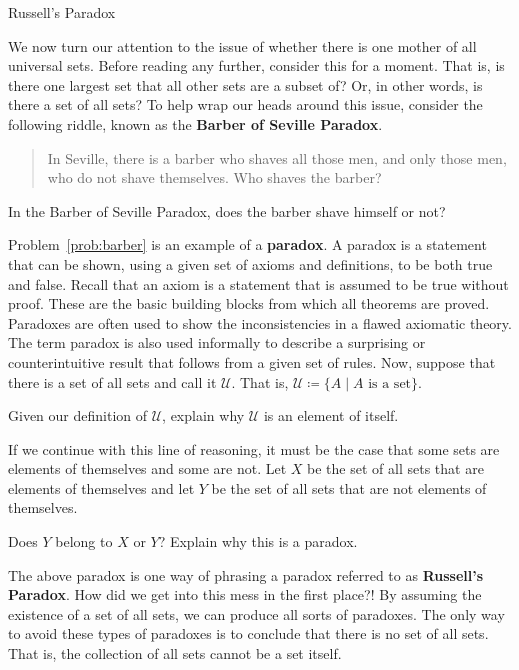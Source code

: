 \begin{section}{Russell's Paradox}\label{sec:RussellsParadox}

We now turn our attention to the issue of whether there is one mother of all universal sets.  Before reading any further, consider this for a moment.  That is, is there one largest set that all other sets are a subset of?  Or, in other words, is there a set of all sets?  To help wrap our heads around this issue, consider the following riddle, known as the \textbf{Barber of Seville Paradox}.

\begin{quote}
In Seville, there is a barber who shaves all those men, and only those men, who do not shave themselves.  Who shaves the barber?
\end{quote}

\begin{problem}\label{prob:barber}
In the Barber of Seville Paradox, does the barber shave himself or not?
\end{problem}

Problem~\ref{prob:barber} is an example of a \textbf{paradox}. A paradox is a statement that can be shown, using a given set of axioms and definitions, to be both true and false. Recall that an axiom is a statement that is assumed to be true without proof. These are the basic building blocks from which all theorems are proved. Paradoxes are often used to show the inconsistencies in a flawed axiomatic theory.  The term paradox is also used informally to describe a surprising or counterintuitive result that follows from a given set of rules.  Now, suppose that there is a set of all sets and call it $\mathcal{U}$.  That is, $\mathcal{U}\coloneqq \{A\mid A\mbox{ is a set}\}$.

\begin{problem}
Given our definition of $\mathcal{U}$, explain why $\mathcal{U}$ is an element of itself.
\end{problem}

If we continue with this line of reasoning, it must be the case that some sets are elements of themselves and some are not.  Let $X$ be the set of all sets that are elements of themselves and let $Y$ be the set of all sets that are not elements of themselves.

\begin{problem}\label{prob:russell}
Does $Y$ belong to $X$ or $Y$?  Explain why this is a paradox.
\end{problem}

The above paradox is one way of phrasing a paradox referred to as \textbf{Russell's Paradox}.  How did we get into this mess in the first place?!  By assuming the existence of a set of all sets, we can produce all sorts of paradoxes.  The only way to avoid these types of paradoxes is to conclude that there is no set of all sets.  That is, the collection of all sets cannot be a set itself.


\end{section}
